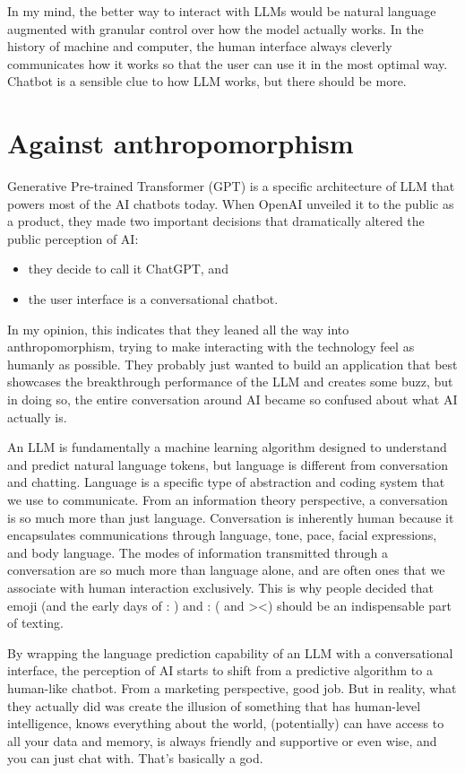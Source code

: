 \documentclass[12pt]{article}
\begin{document}
In my mind, the better way to interact with LLMs would be natural language augmented with granular control over how the model actually works. In the history of machine and computer, the human interface always cleverly communicates how it works so that the user can use it in the most optimal way. Chatbot is a sensible clue to how LLM works, but there should be more.

\section{Against anthropomorphism} \label{anthropo}
Generative Pre-trained Transformer (GPT) is a specific architecture of LLM that powers most of the AI chatbots today. When OpenAI unveiled it to the public as a product, they made two important decisions that dramatically altered the public perception of AI:
\begin{itemize}
    \item they decide to call it ChatGPT, and
    \item the user interface is a conversational chatbot.
\end{itemize}
In my opinion, this indicates that they leaned all the way into anthropomorphism, trying to make interacting with the technology feel as humanly as possible. They probably just wanted to build an application that best showcases the breakthrough performance of the LLM and creates some buzz, but in doing so, the entire conversation around AI became so confused about what AI actually is.

An LLM is fundamentally a machine learning algorithm designed to understand and predict natural language tokens, but language is different from conversation and chatting. Language is a specific type of abstraction and coding system that we use to communicate. From an information theory perspective, a conversation is so much more than just language. Conversation is inherently human because it encapsulates communications through language, tone, pace, facial expressions, and body language. The modes of information transmitted through a conversation are so much more than language alone, and are often ones that we associate with human interaction exclusively. This is why people decided that emoji (and the early days of : ) and : ( and ><) should be an indispensable part of texting.

By wrapping the language prediction capability of an LLM with a conversational interface, the perception of AI starts to shift from a predictive algorithm to a human-like chatbot. From a marketing perspective, good job. But in reality, what they actually did was create the illusion of something that has human-level intelligence, knows everything about the world, (potentially) can have access to all your data and memory, is always friendly and supportive or even wise, and you can just chat with. That's basically a god.
\end{document}

